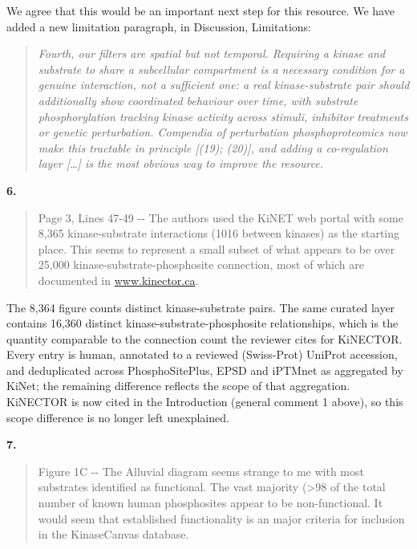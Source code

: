 \documentclass[
]{article}
\begin{document}
We agree that this would be an important next step for this resource. We
have added a new limitation paragraph, in Discussion, Limitations:

\begin{quote}
\emph{Fourth, our filters are spatial but not temporal. Requiring a
kinase and substrate to share a subcellular compartment is a necessary
condition for a genuine interaction, not a sufficient one: a real
kinase-substrate pair should additionally show coordinated behaviour
over time, with substrate phosphorylation tracking kinase activity
across stimuli, inhibitor treatments or genetic perturbation. Compendia
of perturbation phosphoproteomics now make this tractable in principle
{[}(19); (20){]}, and adding a co-regulation layer {[}\ldots{]} is the
most obvious way to improve the resource.}
\end{quote}

\textbf{6.}

\begin{quote}
Page 3, Lines 47-49 -\/- The authors used the KiNET web portal with some
8,365 kinase-substrate interactions (1016 between kinases) as the
starting place. This seems to represent a small subset of what appears
to be over 25,000 kinase-substrate-phosphosite connection, most of which
are documented in \href{http://www.kinector.ca}{www.kinector.ca}.
\end{quote}

The 8,364 figure counts distinct kinase-substrate pairs. The same
curated layer contains 16,360 distinct kinase-substrate-phosphosite
relationships, which is the quantity comparable to the connection count
the reviewer cites for KiNECTOR. Every entry is human, annotated to a
reviewed (Swiss-Prot) UniProt accession, and deduplicated across
PhosphoSitePlus, EPSD and iPTMnet as aggregated by KiNet; the remaining
difference reflects the scope of that aggregation. KiNECTOR is now cited
in the Introduction (general comment 1 above), so this scope difference
is no longer left unexplained.

\textbf{7.}

\begin{quote}
Figure 1C -\/- The Alluvial diagram seems strange to me with most
substrates identified as functional. The vast majority (\textgreater98
of the total number of known human phosphosites appear to be
non-functional. It would seem that established functionality is an major
criteria for inclusion in the KinaseCanvas database.
\end{quote}
\end{document}
